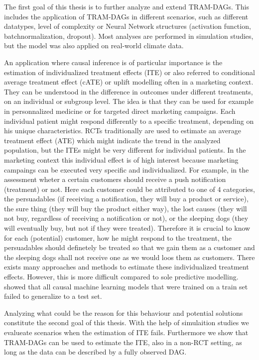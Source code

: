 The first goal of this thesis is to further analyze and extend TRAM-DAGs. This includes the application of TRAM-DAGs in different scenarios, such as different datatypes, level of complexity or Neural Network structures (activation function, batchnormalization, dropout). Most analyses are performed in simulation studies, but the model was also applied on real-world climate data.


An application where causal inference is of particular importance is the estimation of individualized treatment effects (ITE) or also referred to conditional average treatment effect (cATE) or uplift modelling often in a marketing context. They can be understood in the difference in outcomes under different treatments, on an individual or subgroup level. The idea is that they can be used for example in personnalized medicine or for targeted direct marketing campaigns. Each individual patient might respond differently to a specific treatment, depending on his unique characteristics. RCTs traditionally are used to estimate an average treatment effect (ATE) which might indicate the trend in the analyzed population, but the ITEs might be very different for individual patients. In the marketing context this individual effect is of high interest because marketing campaings can be executed very specific and individualized. For example, in the assessment wheter a certain customers should receive a push notification (treatment) or not. Here each customer could be attributed to one of 4 categories, the persuadables (if receiving a notification, they will buy a product or service), the sure thing (they will buy the product either way), the lost causes (they will not buy, regardless of receiving a notification or not), or the sleeping dogs (they will eventually buy, but not if they were treated). Therefore it is crucial to know for each (potential) customer, how he might respond to the treatment, the persuadables should definetely be treated so that we gain them as a customer and the sleeping dogs shall not receive one as we would loos them as customers. There exists many approaches and methods to estimate these individualized treatment effects. However, this is more difficult compared to sole predictive modelling. \citet{chen2025} showed that all causal machine learning models that were trained on a train set failed to generalize to a test set. 

Analyzing what could be the reason for this behaviour and potential solutions constitute the second goal of this thesis. With the help of simulaition studies we evalueate scenarios when the estimation of ITE fails. Furthermore we show that TRAM-DAGs can be used to estimate the ITE, also in a non-RCT setting, as long as the data can be described by a fully observed DAG.







